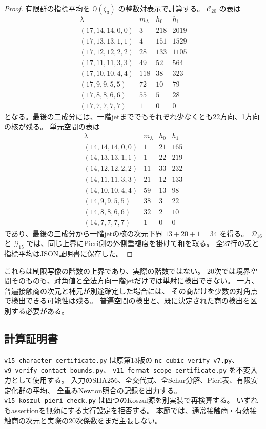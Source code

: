 \documentclass[a4paper,11pt]{ltjsarticle}
\theoremstyle{definition}
\begin{document}
\begin{proof}
有限群の指標平均を $\mathbb Q(\zeta_3)$ の整数対表示で計算する。
$\mathcal C_{20}$ の表は
\[
\begin{array}{c|r|r|r}
\lambda&m_\lambda&h_0&h_1\\\hline
(17,14,14,0,0)&3&218&2019\\
(17,13,13,1,1)&4&151&1529\\
(17,12,12,2,2)&28&133&1105\\
(17,11,11,3,3)&49&52&564\\
(17,10,10,4,4)&118&38&323\\
(17,9,9,5,5)&72&10&79\\
(17,8,8,6,6)&55&5&28\\
(17,7,7,7,7)&1&0&0
\end{array}
\]
となる。最後の二成分には、一階jetまででもそれぞれ少なくとも22方向、1方向の核が残る。
単元空間の表は
\[
\begin{array}{c|r|r|r}
\lambda&m_\lambda&h_0&h_1\\\hline
(14,14,14,0,0)&1&21&165\\
(14,13,13,1,1)&1&22&219\\
(14,12,12,2,2)&11&33&232\\
(14,11,11,3,3)&21&12&133\\
(14,10,10,4,4)&59&13&98\\
(14,9,9,5,5)&38&3&22\\
(14,8,8,6,6)&32&2&10\\
(14,7,7,7,7)&1&0&0
\end{array}
\]
であり、最後の三成分から一階jetの核の次元下界 $13+20+1=34$ を得る。
$\mathcal D_{16}$ と $\mathcal G_{15}$ では、同じ上界にPieri側の外側重複度を掛けて和を取る。
全27行の表と指標平均はJSON証明書に保存した。
\end{proof}

これらは制限写像の階数の上界であり、実際の階数ではない。
20次では境界空間そのものも、対角値と全法方向一階jetだけでは単射に検出できない。
一方、普遍接触商の次元と補元が別途確定した場合には、
その商だけを少数の対角点で検出できる可能性は残る。
普遍空間の検出と、既に決定された商の検出を区別する必要がある。

\subsection{計算証明書}

\nolinkurl{v15_character_certificate.py} は原第13版の
\nolinkurl{nc_cubic_verify_v7.py}、
\nolinkurl{v9_verify_contact_bounds.py}、
\nolinkurl{v11_fermat_scope_certificate.py} を不変入力として使用する。
入力のSHA256、全交代式、全Schur分解、Pieri表、有限安定化群の平均、
全重みNewton照合の記録を出力する。
\nolinkurl{v15_koszul_pieri_check.py} は四つのKoszul源を別実装で再検算する。
いずれもassertionを無効にする実行設定を拒否する。
本節では、通常接触商・有効接触商の次元と実際の20次係数をまだ主張しない。
\end{document}
